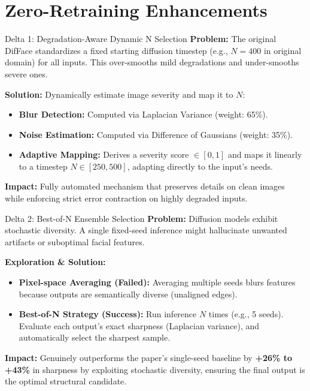 \documentclass[aspectratio=169]{beamer}
\begin{document}
\section{Zero-Retraining Enhancements}

\begin{frame}{Delta 1: Degradation-Aware Dynamic N Selection}
    \textbf{Problem:} The original DifFace standardizes a fixed starting diffusion timestep (e.g., $N=400$ in original domain) for all inputs. This over-smooths mild degradations and under-smooths severe ones.
    
    \vspace{0.2cm}
    \textbf{Solution:} Dynamically estimate image severity and map it to $N$:
    \begin{itemize}
        \item \textbf{Blur Detection:} Computed via Laplacian Variance (weight: 65\%).
        \item \textbf{Noise Estimation:} Computed via Difference of Gaussians (weight: 35\%).
        \item \textbf{Adaptive Mapping:} Derives a severity score $\in [0, 1]$ and maps it linearly to a timestep $N \in [250, 500]$, adapting directly to the input's needs.
    \end{itemize}
    
    \vspace{0.2cm}
    \textbf{Impact:} Fully automated mechanism that preserves details on clean images while enforcing strict error contraction on highly degraded inputs.
\end{frame}

\begin{frame}{Delta 2: Best-of-N Ensemble Selection}
    \textbf{Problem:} Diffusion models exhibit stochastic diversity. A single fixed-seed inference might hallucinate unwanted artifacts or suboptimal facial features.
    
    \vspace{0.2cm}
    \textbf{Exploration \& Solution:}
    \begin{itemize}
        \item \textbf{Pixel-space Averaging (Failed):} Averaging multiple seeds blurs features because outputs are semantically diverse (unaligned edges).
        \item \textbf{Best-of-N Strategy (Success):} Run inference $N$ times (e.g., 5 seeds). Evaluate each output's exact sharpness (Laplacian variance), and automatically select the sharpest sample.
    \end{itemize}
    
    \vspace{0.2cm}
    \textbf{Impact:} Genuinely outperforms the paper's single-seed baseline by \textbf{+26\% to +43\%} in sharpness by exploiting stochastic diversity, ensuring the final output is the optimal structural candidate.
\end{frame}
\end{document}
